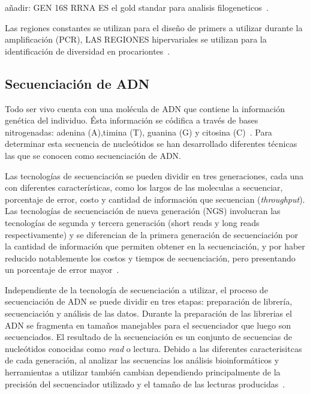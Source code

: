 


añadir: GEN 16S RRNA ES el gold standar para analisis filogeneticos~\cite{boers2019understanding}.

Las regiones constantes se utilizan para el diseño de primers a utilizar durante la amplificación (PCR), LAS REGIONES hipervariales se utilizan para la identificación de diversidad en procariontes~\cite{chakravorty2007detailed}.
\subsection{Secuenciación de ADN}
Todo ser vivo cuenta con una molécula de ADN que contiene la información genética del individuo. Ésta información se códifica a través de bases nitrogenadas: adenina (A),timina (T), guanina (G) y citosina (C)~\cite{watson1953molecular}. 
Para determinar esta secuencia de nucleótidos se han desarrollado diferentes técnicas las que se conocen como secuenciación de ADN. 

Las tecnologías de secuenciación se pueden dividir en tres generaciones, cada una con diferentes características, como los largos de las moleculas a secuenciar, porcentaje de error, costo y cantidad de información que secuencian (\textit{throughput}).
Las tecnologías de secuenciación de nueva generación (NGS) involucran las tecnologías de segunda y tercera generación (short reads y long reads respectivamente) y se diferencian de la primera generación de secuenciación por la cantidad de información que permiten obtener en la secuenciación, y por haber reducido notablemente los costos y tiempos de secuenciación, pero presentando un porcentaje de error mayor~\cite{kumar2024next}. 

Independiente de la tecnología de secuenciación a utilizar, el proceso de secuenciación de ADN se puede dividir en tres etapas: preparación de librería, secuenciación y análisis de las datos. Durante la preparación de las librerias el ADN se fragmenta en tamaños manejables para el secuenciador que luego son secuenciados. El resultado de la secuenciación es un conjunto de secuencias de nucleótidos conocidas como \textit{read} o lectura.
Debido a las diferentes caracterisitcas de cada generación, al analizar las secuencias los análisis bioinformáticos y herramientas a utilizar también cambian dependiendo principalmente de la precisión del secuenciador utilizado y el tamaño de las lecturas producidas~\cite{bierman2014understanding}.

